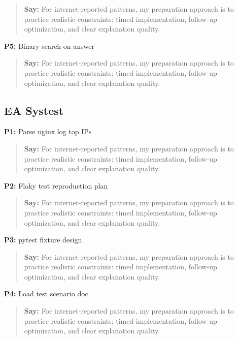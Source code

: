 \documentclass[9pt,a4paper]{article}
\begin{document}
\begin{quote}\small\textbf{Say:} For internet-reported patterns, my preparation approach is to practice realistic constraints: timed implementation, follow-up optimization, and clear explanation quality.\end{quote}
\vspace{2mm}
\textbf{P5:} Binary search on answer

\begin{quote}\small\textbf{Say:} For internet-reported patterns, my preparation approach is to practice realistic constraints: timed implementation, follow-up optimization, and clear explanation quality.\end{quote}
\vspace{2mm}
\subsection{EA Systest}
\textbf{P1:} Parse nginx log top IPs

\begin{quote}\small\textbf{Say:} For internet-reported patterns, my preparation approach is to practice realistic constraints: timed implementation, follow-up optimization, and clear explanation quality.\end{quote}
\vspace{2mm}
\textbf{P2:} Flaky test reproduction plan

\begin{quote}\small\textbf{Say:} For internet-reported patterns, my preparation approach is to practice realistic constraints: timed implementation, follow-up optimization, and clear explanation quality.\end{quote}
\vspace{2mm}
\textbf{P3:} pytest fixture design

\begin{quote}\small\textbf{Say:} For internet-reported patterns, my preparation approach is to practice realistic constraints: timed implementation, follow-up optimization, and clear explanation quality.\end{quote}
\vspace{2mm}
\textbf{P4:} Load test scenario doc

\begin{quote}\small\textbf{Say:} For internet-reported patterns, my preparation approach is to practice realistic constraints: timed implementation, follow-up optimization, and clear explanation quality.\end{quote}
\vspace{2mm}
\end{document}
